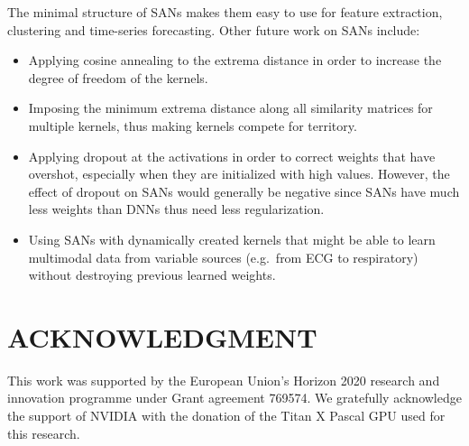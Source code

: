 \documentclass[journal]{IEEEtran}
\begin{document}
The minimal structure of SANs makes them easy to use for feature extraction, clustering and time-series forecasting.
Other future work on SANs include:
\begin{itemize}
	\item Applying cosine annealing to the extrema distance in order to increase the degree of freedom of the kernels.
	\item Imposing the minimum extrema distance along all similarity matrices for multiple kernels, thus making kernels compete for territory.
	\item Applying dropout at the activations in order to correct weights that have overshot, especially when they are initialized with high values.
		However, the effect of dropout on SANs would generally be negative since SANs have much less weights than DNNs thus need less regularization.
	\item Using SANs with dynamically created kernels that might be able to learn multimodal data from variable sources (e.g.\ from ECG to respiratory) without destroying previous learned weights.
\end{itemize}

\section*{ACKNOWLEDGMENT}
This work was supported by the European Union's Horizon 2020 research and innovation programme under Grant agreement 769574.
We gratefully acknowledge the support of NVIDIA with the donation of the Titan X Pascal GPU used for this research.



\end{document}

